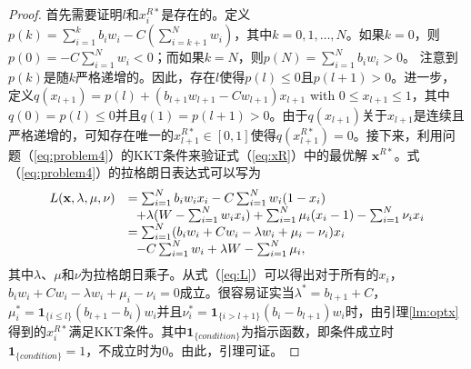 	\begin{proof}
		首先需要证明$l$和$x_i^{R*}$是存在的。定义$p(k)=\sum_{i=1}^{k}b_iw_i-C(\sum_{i=k+1}^{N}w_i)$，其中$k=0,1,\dots,N$。如果$k=0$，则$p(0)=-C\sum_{i=1}^{N}w_i<0$；而如果$k=N$，则$p(N)=\sum_{i=1}^{N}b_iw_i>0$。 注意到$p(k)$是随$k$严格递增的。因此，存在$l$使得$p(l)\le 0$且$p(l+1)>0$。进一步，定义$q(x_{l+1})=p(l)+(b_{l+1}w_{l+1}-Cw_{l+1})x_{l+1}$ with $0\le x_{l+1}\le 1$，其中$q(0)=p(l)\le 0$并且$q(1)=p(l+1)>0$。由于$q(x_{l+1})$关于$x_{l+1}$是连续且严格递增的，可知存在唯一的$x_{l+1}^{R*}\in[0,1]$使得$q(x_{l+1}^{R*})=0$。接下来，利用问题（\ref{eq:problem4}）的KKT条件来验证式（\ref{eq:xR}）中的最优解 $\mathbf{x}^{R*}$。式（\ref{eq:problem4}）的拉格朗日表达式可以写为
		\begin{equation}%
		\hspace{-0.0cm}
		\begin{array}
		[c]{lll}%
		L(\mathbf{x},\lambda,\mu,\nu)&=\sum_{i=1}^{N}b_iw_ix_i-C\sum_{i=1}^{N}w_i(1-x_i)\\
		&~~+\lambda(W-\sum_{i=1}^Nw_ix_i)+\sum_{i=1}^N\mu_i(x_i-1)-\sum_{i=1}^N\nu_ix_i\\
		&=\sum_{i=1}^{N}(b_iw_i+Cw_i-\lambda w_i+\mu_i-\nu_i)x_i\\
		&~~-C\sum_{i=1}^{N}w_i+\lambda W-\sum_{i=1}^{N}\mu_i,
		\end{array}
		\label{eq:L}
		\end{equation}
		其中$\lambda$、$\mu$和$\nu$为拉格朗日乘子。从式（\ref{eq:L}）可以得出对于所有的$x_i$，$b_iw_i+Cw_i-\lambda w_i+\mu_i-\nu_i=0$成立。很容易证实当$\lambda^*=b_{l+1}+C$，$\mu_i^*=\mathbf{1}_{\{i\le l\}}(b_{l+1}-b_i)w_i$并且$\nu_i^*=\mathbf{1}_{\{i>l+1\}}(b_i-b_{l+1})w_i$时，由引理\ref{lm:optx}得到的$x_i^{R*}$满足KKT条件。其中$\mathbf{1}_{\{condition\}}$为指示函数，即条件成立时$\mathbf{1}_{\{condition\}}=1$，不成立时为0。由此，引理可证。
	\end{proof}
	
